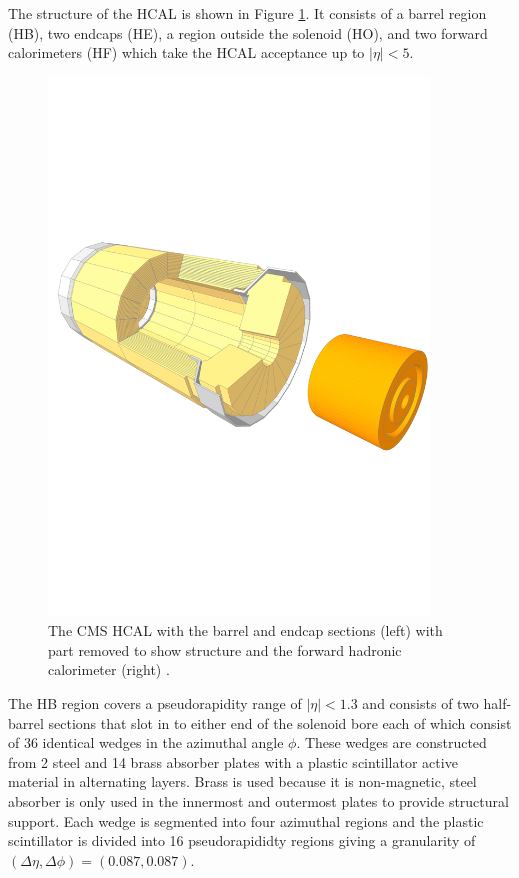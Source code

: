 The structure of the HCAL is shown in Figure \ref{fig:apparatus:hcal}. It consists of a barrel region (HB), two endcaps (HE), a region outside the solenoid (HO), and two forward calorimeters (HF) which take the HCAL acceptance up to $|\eta|<5$. 
\begin{figure}[h!]
    \includegraphics[width=0.9\textwidth]{figures/apparatus/HCAL_HF.pdf}
    \caption{The CMS HCAL with the barrel and endcap sections (left) with part removed to show structure and the forward hadronic calorimeter (right) \cite{SketchupCMS}.}
    \label{fig:apparatus:hcal}
\end{figure}
The HB region covers a pseudorapidity range of $|\eta|<1.3$ and consists of two half-barrel sections that slot in to either end of the solenoid bore each of which consist of 36 identical wedges in the azimuthal angle $\phi$. These wedges are constructed from 2 steel and 14 brass absorber plates with a plastic scintillator active material in alternating layers. Brass is used because it is non-magnetic, steel absorber is only used in the innermost and outermost plates to provide structural support. Each wedge is segmented into four azimuthal regions and the plastic scintillator is divided into 16 pseudorapididty regions giving a granularity of $(\Delta\eta,\Delta\phi) = (0.087,0.087)$.

